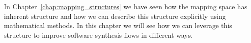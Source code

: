 In Chapter~\ref{chap:mapping_structures} we have seen how the mapping space has inherent structure and how we can describe this structure explicitly using mathematical methods.
In this chapter we will see how we can leverage this structure to improve software synthesis flows in different ways.